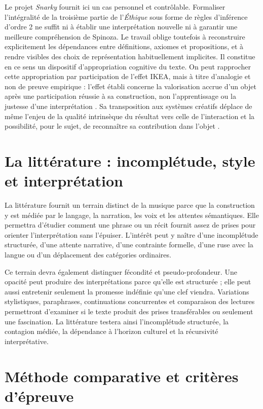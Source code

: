 \documentclass[11pt,a4paper]{article}
\begin{document}
Le projet \emph{Snarky} fournit ici un cas personnel et contrôlable. Formaliser
l'intégralité de la troisième partie de l'\emph{Éthique} sous forme de règles
d'inférence d'ordre 2 ne suffit ni à établir une interprétation nouvelle ni à
garantir une meilleure compréhension de Spinoza. Le travail oblige toutefois à
reconstruire explicitement les dépendances entre définitions, axiomes et
propositions, et à rendre visibles des choix de représentation habituellement
implicites. Il constitue en ce sens un dispositif d'appropriation cognitive du
texte. On peut rapprocher cette appropriation par participation de l'effet IKEA,
mais à titre d'analogie et non de preuve empirique : l'effet établi concerne la
valorisation accrue d'un objet après une participation réussie à sa construction,
non l'apprentissage ou la justesse d'une interprétation
\parencite{norton2012ikea}. Sa transposition aux systèmes créatifs déplace de
même l'enjeu de la qualité intrinsèque du résultat vers celle de l'interaction et
la possibilité, pour le sujet, de reconnaître sa contribution dans l'objet
\parencite[152--153]{pachet2026generation}.

\section{La littérature : incomplétude, style et interprétation}

La littérature fournit un terrain distinct de la musique parce que la
construction y est médiée par le langage, la narration, les voix et les attentes
sémantiques. Elle permettra d'étudier comment une phrase ou un récit fournit
assez de prises pour orienter l'interprétation sans l'épuiser. L'intérêt peut y
naître d'une incomplétude structurée, d'une attente narrative, d'une contrainte
formelle, d'une ruse avec la langue ou d'un déplacement des catégories
ordinaires.

Ce terrain devra également distinguer fécondité et pseudo-profondeur. Une
opacité peut produire des interprétations parce qu'elle est structurée ; elle
peut aussi entretenir seulement la promesse indéfinie qu'une clef viendra.
Variations stylistiques, paraphrases, continuations concurrentes et comparaison
des lectures permettront d'examiner si le texte produit des prises
transférables ou seulement une fascination. La littérature testera ainsi
l'incomplétude structurée, la contagion médiée, la dépendance à l'horizon
culturel et la récursivité interprétative.

\section{Méthode comparative et critères d'épreuve}
\end{document}
